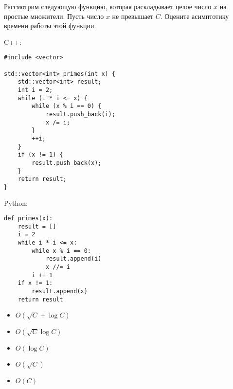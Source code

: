 \documentclass[a4paper]{article}
\begin{document}
Рассмотрим следующую функцию, которая раскладывает целое число $x$ на простые множители. Пусть число $x$ не превышает $C$. Оцените асимптотику времени работы этой функции.

\SPACE

\noindent C++:

\begin{lstlisting}[style=C++]
#include <vector>

std::vector<int> primes(int x) {
    std::vector<int> result;
    int i = 2;
    while (i * i <= x) {
        while (x % i == 0) {
            result.push_back(i);
            x /= i;
        }
        ++i;
    }
    if (x != 1) {
        result.push_back(x);
    }
    return result;
}
\end{lstlisting}

\SPACE

\noindent Python:

\begin{lstlisting}[style=Python]
def primes(x):
    result = []
    i = 2
    while i * i <= x:
        while x % i == 0:
            result.append(i)
            x //= i
        i += 1
    if x != 1:
        result.append(x)
    return result
\end{lstlisting}

\SPACE

\LINE

\SPACE

\begin{itemize}
\item $O(\sqrt{C} + \log C)$
\item $O(\sqrt{C} \log C)$
\item $O(\log C)$
\item $O(\sqrt{C})$
\item $O(C)$
\end{itemize}
\end{document}
